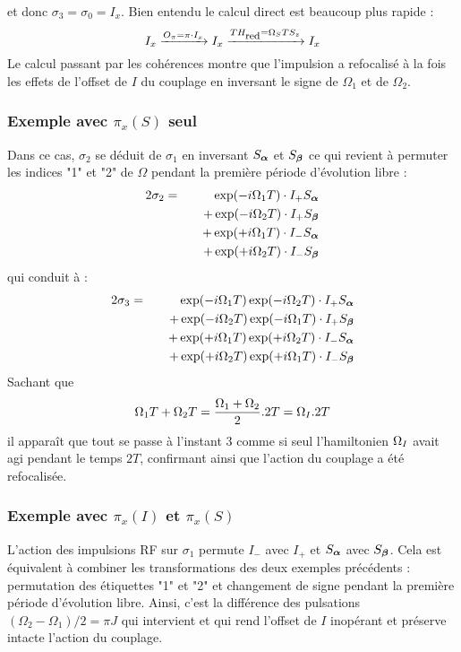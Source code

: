 et donc $\sigma_3 = \sigma_0 = I_x$.
Bien entendu le calcul direct est beaucoup plus rapide :
\begin{equation}
I_x \xrightarrow{O_{\pi}=\pi\cdot I_x} I_x
\xrightarrow{TH_{\mbox{\footnotesize{red}}}=\Omega_S T S_z } I_x
\end{equation}
Le calcul passant par les cohérences montre que l'impulsion
a refocalisé à la fois les effets de l'offset de $I$ du couplage
en inversant le signe de $\Omega_1$ et de $\Omega_2$.

\subsubsection{Exemple avec $\pi_x(S)$ seul}
Dans ce cas, $\sigma_2$ se déduit de $\sigma_1$ en inversant $S_{\boldsymbol{\alpha}}$
et $S_{\boldsymbol{\beta}}$ ce qui revient à permuter les indices "1" et "2" de $\Omega$
pendant la première période d'évolution libre :
\begin{eqnarray}
2\sigma_2 & = & \exp(-i\Omega_1 T) \cdot I_+S_{\boldsymbol{\alpha}} \nonumber\\
& & \quad + \exp(-i\Omega_2 T) \cdot I_+S_{\boldsymbol{\beta}} \nonumber\\
& & \quad + \exp(+i\Omega_1 T) \cdot I_-S_{\boldsymbol{\alpha}} \nonumber\\
& & \quad + \exp(+i\Omega_2 T) \cdot I_-S_{\boldsymbol{\beta}}
\end{eqnarray}
qui conduit à :
\begin{eqnarray}
2\sigma_3 & = & \exp(-i\Omega_1 T)\exp(-i\Omega_2 T) \cdot I_+S_{\boldsymbol{\alpha}} \nonumber\\
& & \quad + \exp(-i\Omega_2 T)\exp(-i\Omega_1 T) \cdot I_+S_{\boldsymbol{\beta}} \nonumber\\
& & \quad + \exp(+i\Omega_1 T)\exp(+i\Omega_2 T) \cdot I_-S_{\boldsymbol{\alpha}} \nonumber\\
& & \quad + \exp(+i\Omega_2 T)\exp(+i\Omega_1 T) \cdot I_-S_{\boldsymbol{\beta}}
\end{eqnarray}
Sachant que 
\begin{equation}
\Omega_1 T + \Omega_2 T = \frac{\Omega_1 + \Omega_2}{2}.2T = \Omega_I.2T
\end{equation}
il apparaît que tout se passe à l'instant 3 comme si seul l'hamiltonien
$\Omega_I$ avait agi pendant le temps $2T$, confirmant ainsi
que l'action du couplage a été refocalisée.

\subsubsection{Exemple avec $\pi_x(I)$ et $\pi_x(S)$}
L'action des impulsions RF sur $\sigma_1$ permute $I_-$ avec $I_+$ et
$S_{\boldsymbol{\alpha}}$ avec $S_{\boldsymbol{\beta}}$.
Cela est équivalent à combiner les transformations des deux exemples précédents :
permutation des étiquettes "1" et "2" et changement de signe
pendant la première période d'évolution libre.
Ainsi, c'est la différence des pulsations $(\Omega_2 - \Omega_1)/2 = \pi J$
qui intervient et qui rend l'offset de $I$ inopérant et préserve intacte
l'action du couplage.

